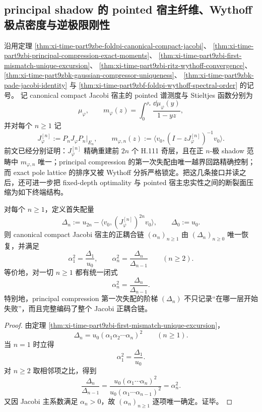 \subsection{principal shadow 的 pointed 宿主纤维、Wythoff 极点密度与逆极限刚性}\label{subsec:conclusion-principal-shadow-pointed-host-localglobal-rigidity}
沿用定理 \ref{thm:xi-time-part9zbe-foldpi-canonical-compact-jacobi}、
\ref{thm:xi-time-part9zbi-principal-compression-exact-moments}、
\ref{thm:xi-time-part9zbi-first-mismatch-unique-excursion}、
\ref{thm:xi-time-part9zbi-ritz-wythoff-convergence}、
\ref{thm:xi-time-part9zbk-gaussian-compressor-uniqueness}、
\ref{thm:xi-time-part9zbk-pade-jacobi-identity}
与
\ref{thm:xi-time-part9zbf-foldpi-wythoff-spectral-order}
的记号。
记 canonical compact Jacobi 宿主的 pointed 谱测度与 Stieltjes 函数分别为
\[
\mu_\varphi,
\qquad
m_\varphi(z)=\int_{0}^{\rho_\ast}\frac{\dd\mu_\varphi(y)}{1-yz},
\]
并对每个 \(n\ge 1\) 记
\[
J_\varphi^{[n]}:=P_nJ_\varphi P_n|_{E_n},
\qquad
m_{\varphi,n}(z):=\langle v_0,(I-zJ_\varphi^{[n]})^{-1}v_0\rangle.
\]
前文已经分别证明：\(J_\varphi^{[n]}\) 精确重建前 \(2n\) 个 H.111 奇层，且在正 \(n\)-极 shadow 范畴中 \(m_{\varphi,n}\) 唯一；principal compression 的第一次失配由唯一越界回路精确控制；而 exact pole lattice 的排序又被 Wythoff 分拆严格锁定。把这几条接口并读之后，还可进一步把 fixed-depth optimality 与 pointed 宿主忠实性之间的断裂面压缩为如下终端结构。

\begin{theorem}\label{thm:conclusion-principal-shadow-mismatch-ladder-jacobi-coupling-inversion}
对每个 \(n\ge 1\)，定义首失配量
\[
\Delta_n
:=
u_{2n}-\langle v_0,(J_\varphi^{[n]})^{2n}v_0\rangle,
\qquad
\Delta_0:=u_0.
\]
则 canonical compact Jacobi 宿主的正耦合链 \((\alpha_n)_{n\ge 1}\) 由 \((\Delta_n)_{n\ge 0}\) 唯一恢复，并满足
\[
\alpha_1^2=\frac{\Delta_1}{u_0},
\qquad
\alpha_n^2=\frac{\Delta_n}{\Delta_{n-1}}
\qquad (n\ge 2).
\]
等价地，对一切 \(n\ge 1\) 都有统一闭式
\[
\alpha_n^2=\frac{\Delta_n}{\Delta_{n-1}}.
\]
特别地，principal compression 第一次失配的阶梯 \((\Delta_n)\) 不只记录“在哪一层开始失败”，而且完整编码了整个 Jacobi 正耦合链。
\end{theorem}
\begin{proof}
由定理 \ref{thm:xi-time-part9zbi-first-mismatch-unique-excursion}，
\[
\Delta_n=u_0(\alpha_1\alpha_2\cdots \alpha_n)^2
\qquad (n\ge 1).
\]
当 \(n=1\) 时立得
\[
\alpha_1^2=\frac{\Delta_1}{u_0}.
\]
对 \(n\ge 2\) 取相邻项之比，得到
\[
\frac{\Delta_n}{\Delta_{n-1}}
=
\frac{u_0(\alpha_1\cdots\alpha_n)^2}{u_0(\alpha_1\cdots\alpha_{n-1})^2}
=
\alpha_n^2.
\]
又因 Jacobi 主系数满足 \(\alpha_n>0\)，故 \((\alpha_n)_{n\ge 1}\) 逐项唯一确定。证毕。
\end{proof}

